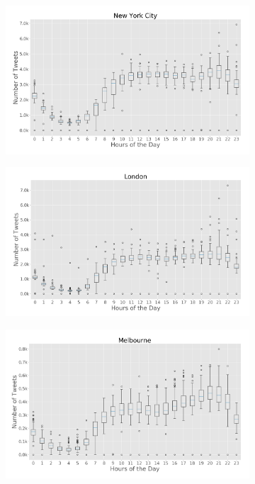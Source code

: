 \begin{figure}[!htbp]
	\begin{subfigure}[htbp]{0.45\textwidth}
		\centering
		\includegraphics[width=1\linewidth]{figures/nyc_box_plt_hour_of_day.png}
		\caption{}
		\label{subfig:newyork_box_plot_hour_of_day}
	\end{subfigure}
	\quad
	\begin{subfigure}[htbp]{0.45\textwidth}
		\centering
		\includegraphics[width=1\linewidth]{figures/london_box_plt_hour_of_day.png}
		\caption{}
		\label{subfig:london_box_plot_hour_of_day}
	\end{subfigure}
	
	\medskip
	
	\begin{subfigure}[htbp]{0.45\textwidth}
		\centering
		\includegraphics[width=1\linewidth]{figures/melbourne_box_plt_hour_of_day.png}
		\caption{}
		\label{subfig:melbourne_box_plot_hour_of_day}
	\end{subfigure}
	

\end{figure}

